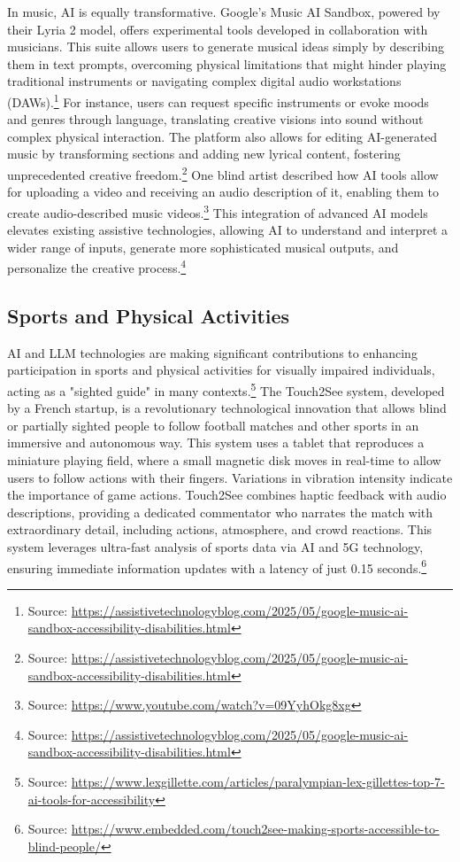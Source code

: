 In music, AI is equally transformative. Google's Music AI Sandbox, powered by their Lyria 2 model, offers experimental tools developed in collaboration with musicians. This suite allows users to generate musical ideas simply by describing them in text prompts, overcoming physical limitations that might hinder playing traditional instruments or navigating complex digital audio workstations (DAWs).\footnote{Source: \url{https://assistivetechnologyblog.com/2025/05/google-music-ai-sandbox-accessibility-disabilities.html}} For instance, users can request specific instruments or evoke moods and genres through language, translating creative visions into sound without complex physical interaction. The platform also allows for editing AI-generated music by transforming sections and adding new lyrical content, fostering unprecedented creative freedom.\footnote{Source: \url{https://assistivetechnologyblog.com/2025/05/google-music-ai-sandbox-accessibility-disabilities.html}} One blind artist described how AI tools allow for uploading a video and receiving an audio description of it, enabling them to create audio-described music videos.\footnote{Source: \url{https://www.youtube.com/watch?v=09YyhOkg8xg}} This integration of advanced AI models elevates existing assistive technologies, allowing AI to understand and interpret a wider range of inputs, generate more sophisticated musical outputs, and personalize the creative process.\footnote{Source: \url{https://assistivetechnologyblog.com/2025/05/google-music-ai-sandbox-accessibility-disabilities.html}}

\subsection{Sports and Physical Activities}

AI and LLM technologies are making significant contributions to enhancing participation in sports and physical activities for visually impaired individuals, acting as a "sighted guide" in many contexts.\footnote{Source: \url{https://www.lexgillette.com/articles/paralympian-lex-gillettes-top-7-ai-tools-for-accessibility}} The Touch2See system, developed by a French startup, is a revolutionary technological innovation that allows blind or partially sighted people to follow football matches and other sports in an immersive and autonomous way. This system uses a tablet that reproduces a miniature playing field, where a small magnetic disk moves in real-time to allow users to follow actions with their fingers. Variations in vibration intensity indicate the importance of game actions. Touch2See combines haptic feedback with audio descriptions, providing a dedicated commentator who narrates the match with extraordinary detail, including actions, atmosphere, and crowd reactions. This system leverages ultra-fast analysis of sports data via AI and 5G technology, ensuring immediate information updates with a latency of just 0.15 seconds.\footnote{Source: \url{https://www.embedded.com/touch2see-making-sports-accessible-to-blind-people/}}


